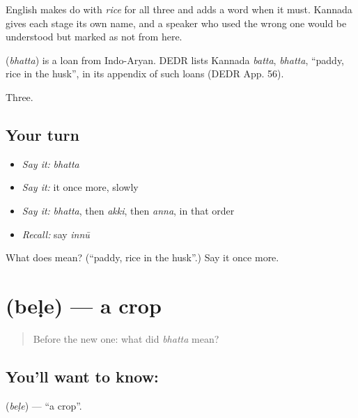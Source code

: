 English makes do with \emph{rice} for all three and adds a word when it must. Kannada gives each stage its own name, and a speaker who used the wrong one would be understood but marked as not from here.

\begin{cousinweb}
\textbf{} (\emph{bhatta}) is a loan from Indo-Aryan. DEDR lists Kannada \emph{batta}, \emph{bhatta}, \textquotedblleft{}paddy, rice in the husk\textquotedblright{}, in its appendix of such loans (DEDR App. 56).
\end{cousinweb}

\begin{grammarlens}[title={What you've built}]
Three.
\end{grammarlens}

\subsection*{Your turn}
\begin{itemize}
\raggedright
  \item \emph{Say it:} \emph{bhatta}
  \item \emph{Say it:} it once more, slowly
  \item \emph{Say it:} \emph{bhatta}, then \emph{akki}, then \emph{anna}, in that order
  \item \emph{Recall:} say \emph{innū}
\end{itemize}

\begin{tcolorbox}[breakable,colback=teal!4,colframe=teal!35!black,title={Before you move on}]
What does  mean? (\textquotedblleft{}paddy, rice in the husk\textquotedblright{}.) Say it once more.
\end{tcolorbox}
\section[\texorpdfstring{\kn{ಬೆಳೆ} (beḷe)}{ಬೆಳೆ (beḷe)}]{ (beḷe) — a crop}

\label{lesson:KA-C66-crop}



\begin{quote}
Before the new one: what did \emph{bhatta} mean?
\end{quote}

\subsection*{You'll want to know: }
\textbf{} (\emph{beḷe}) — \textquotedblleft{}a crop\textquotedblright{}.

